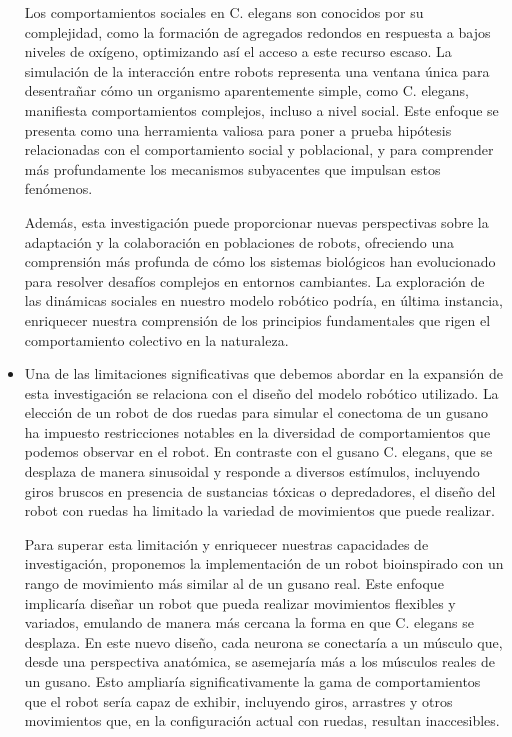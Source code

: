 \begin{itemize}
Los comportamientos sociales en C. elegans son conocidos por su complejidad, como la formación de agregados redondos en respuesta a bajos niveles de oxígeno, optimizando así el acceso a este recurso escaso. La simulación de la interacción entre robots representa una ventana única para desentrañar cómo un organismo aparentemente simple, como C. elegans, manifiesta comportamientos complejos, incluso a nivel social. Este enfoque se presenta como una herramienta valiosa para poner a prueba hipótesis relacionadas con el comportamiento social y poblacional, y para comprender más profundamente los mecanismos subyacentes que impulsan estos fenómenos.

Además, esta investigación puede proporcionar nuevas perspectivas sobre la adaptación y la colaboración en poblaciones de robots, ofreciendo una comprensión más profunda de cómo los sistemas biológicos han evolucionado para resolver desafíos complejos en entornos cambiantes. La exploración de las dinámicas sociales en nuestro modelo robótico podría, en última instancia, enriquecer nuestra comprensión de los principios fundamentales que rigen el comportamiento colectivo en la naturaleza.

\item  Una de las limitaciones significativas que debemos abordar en la expansión de esta investigación se relaciona con el diseño del modelo robótico utilizado. La elección de un robot de dos ruedas para simular el conectoma de un gusano ha impuesto restricciones notables en la diversidad de comportamientos que podemos observar en el robot. En contraste con el gusano C. elegans, que se desplaza de manera sinusoidal y responde a diversos estímulos, incluyendo giros bruscos en presencia de sustancias tóxicas o depredadores, el diseño del robot con ruedas ha limitado la variedad de movimientos que puede realizar.

Para superar esta limitación y enriquecer nuestras capacidades de investigación, proponemos la implementación de un robot bioinspirado con un rango de movimiento más similar al de un gusano real. Este enfoque implicaría diseñar un robot que pueda realizar movimientos flexibles y variados, emulando de manera más cercana la forma en que C. elegans se desplaza. En este nuevo diseño, cada neurona se conectaría a un músculo que, desde una perspectiva anatómica, se asemejaría más a los músculos reales de un gusano. Esto ampliaría significativamente la gama de comportamientos que el robot sería capaz de exhibir, incluyendo giros, arrastres y otros movimientos que, en la configuración actual con ruedas, resultan inaccesibles.


\end{itemize}
